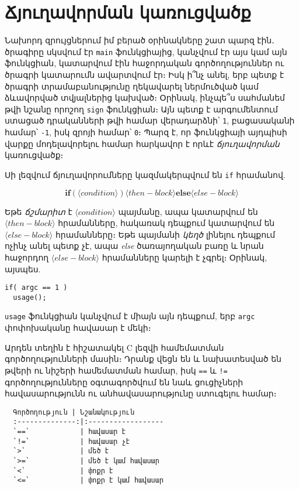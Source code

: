 \chapter{Ճյուղավորման կառուցվածք}

Նախորդ զրույցներում իմ բերած օրինակները շատ պարզ էին․ ծրագիրը սկսվում էր
\texttt{main} ֆունկցիայից, կանչվում էր այս կամ այն ֆունկցիան, կատարվում էին
հաջորդական գործողություններ ու ծրագրի կատարումն ավարտվում էր։ Իսկ ի՞նչ անել,
երբ պետք է ծրագրի տրամաբանությունը ղեկավարել ներմուծված կամ ձևավորված
տվյալներից կախված։ Օրինակ, ինչպե՞ս սահմանեմ թվի նշանը որոշող \texttt{sign}
ֆունկցիան։ Այն պետք է արգումենտում ստացած դրականների թվի համար վերադարձնի՝
\texttt{1}, բացասականի համար՝ \texttt{-1}, իսկ զրոյի համար՝ \texttt{0}։
Պարզ է, որ ֆունկցիայի այդպիսի վարքը մոդելավորելու համար հարկավոր է
որևէ \emph{ճյուղավորման} կառուցվածք։

Սի լեզվում ճյուղավորումները կազմակերպվում են \texttt{if} հրամանով.

\[
\mathbf{if}( \langle condition\rangle )
\langle then-block\rangle
\mathbf{else}
\langle else-block\rangle
\]

Եթե \emph{ճշմարիտ} է \(\langle condition\rangle\) պայմանը, ապա կատարվում
են \(\langle then-block\rangle\) հրամանները, հակառակ դեպքում կատարվում են
\(\langle else-block\rangle\) հրամանները։ Եթե պայմանի \emph{կեղծ} լինելու
դեպքում ոչինչ անել պետք չէ, ապա \emph{else} ծառայողական բառը և նրան հաջորդող
\(\langle else-block\rangle\) հրամանները կարելի է չգրել։ Օրինակ, այսպես.

\begin{verbatim}
if( argc == 1 )
  usage();
\end{verbatim}

\texttt{usage} ֆունկցիան կանչվում է միայն այն դեպքում, երբ \texttt{argc}
փոփոխականը հավասար է մեկի։

Արդեն տեղին է հիշատակել C լեզվի համեմատման գործողությունների մասին։ Դրանք
վեցն են և նախատեսված են թվերի ու նիշերի համեմատման համար, իսկ \verb|==| և
\verb|!=| գործողությունները օգտագործվում են նաև ցուցիչների հավասարությունն
ու անհավասարությունը ստուգելու համար։

\begin{verbatim}
  Գործողություն | Նշանակություն
  :--------------:|:------------------
  `==`            | հավասար է
  `!=`            | հավասար չէ
  `>`             | մեծ է
  `>=`            | մեծ է կամ հավասար
  `<`             | փոքր է
  `<=`            | փոքր է կամ հավասար
\end{verbatim}

